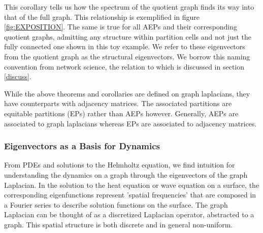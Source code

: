 \documentclass[%
 aip,
 amsmath,amssymb,
preprint,
reprint, onecolumn %
]{revtex4-1}
\begin{document}
This corollary tells us how the spectrum of the quotient graph finds its way into that of the full graph. This relationship is exemplified in figure \ref{fig:EXPOSITION}. The same is true for all AEPs and their corresponding quotient graphs, admitting any structure within partition cells and not just the fully connected one shown in this toy example. We refer to these eigenvectors from the quotient graph as the structural eigenvectors. We borrow this naming convention from network science, the relation to which is discussed in section \ref{discuss}.

While the above theorems and corollaries are defined on graph laplacians, they have counterparts with adjacency matrices. The associated partitions are equitable partitions (EPs) rather than AEPs however. Generally, AEPs are associated to graph laplacians whereas EPs are associated to adjacency matrices.

\subsubsection{Eigenvectors as a Basis for Dynamics}\label{sec:Evecbais}


From PDEs and solutions to the Helmholtz equation, we find intuition for understanding the dynamics on a graph through the eigenvectors of the graph Laplacian. In the solution to the heat equation or wave equation on a surface, the corresponding eigenfunctions represent 'spatial frequencies' that are composed in a Fourier series to describe solution functions on the surface.\cite{haberman2013applied} The graph Laplacian can be thought of as a discretized Laplacian operator, abstracted to a graph. This spatial structure is both discrete and in general non-uniform. 
\end{document}
